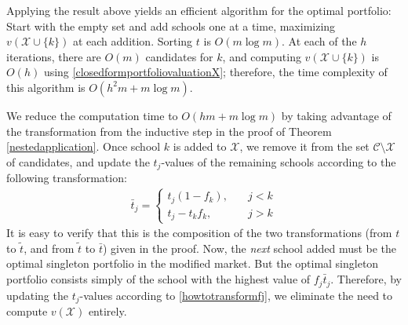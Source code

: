 \documentclass[12pt]{article} %
\DeclareMathOperator*{\argmax}{arg\,max}
\newtheorem{theorem}{Theorem}
\theoremstyle{definition}
\newtheorem{theorem}{정리}
\theoremstyle{definition}
\begin{document}
Applying the result above yields an efficient algorithm for the optimal portfolio: Start with the empty set and add schools one at a time, maximizing $v(\mathcal{X}\cup \{k\})$ at each addition. Sorting $t$ is  $O(m \log m)$.  At each of the $h$ iterations, there are $O(m)$ candidates for $k$, and computing $v(\mathcal{X}\cup \{k\})$ is $O(h)$ using \eqref{closedformportfoliovaluationX}; therefore, the time complexity of this algorithm is $O(h^2 m + m \log m)$. 
%

We reduce the computation time to $O(hm  + m\log m)$ by taking advantage of the transformation from the inductive step in the proof of Theorem \ref{nestedapplication}. Once school $k$ is added to $\mathcal{X}$, we remove it from the set $\mathcal{C}\setminus \mathcal{X}$ of candidates, and update the $t_j$-values of the remaining schools according to the following transformation:
\begin{align}\label{howtotransformfj}
\bar t_j = 
\begin{cases}
t_j (1 - f_k), \quad & j < k \\
t_j - t_k f_k, \quad& j> k
\end{cases}
\end{align}
It is easy to verify that this is the composition of the two transformations (from $t$ to $\tilde t$, and from $\tilde t$ to $\bar t$) given in the proof. Now, the \emph{next} school added must be the optimal singleton portfolio in the modified market. But the optimal singleton portfolio consists simply of the school with the highest value of $f_j \bar t_j$. Therefore, by updating the $t_j$-values according to \eqref{howtotransformfj}, we eliminate the need to compute $v(\mathcal{X})$ entirely.
 
\end{document}
